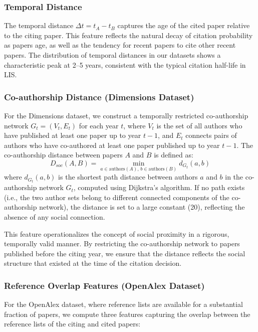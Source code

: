 \documentclass[12pt,a4paper]{article}
\begin{document}
\subsubsection{Temporal Distance}

The temporal distance $\Delta t = t_A - t_B$ captures the age of the cited paper relative to the citing paper. This feature reflects the natural decay of citation probability as papers age, as well as the tendency for recent papers to cite other recent papers. The distribution of temporal distances in our datasets shows a characteristic peak at 2--5 years, consistent with the typical citation half-life in LIS.

\subsubsection{Co-authorship Distance (Dimensions Dataset)}

For the Dimensions dataset, we construct a temporally restricted co-authorship network $G_t = (V_t, E_t)$ for each year $t$, where $V_t$ is the set of all authors who have published at least one paper up to year $t-1$, and $E_t$ connects pairs of authors who have co-authored at least one paper published up to year $t-1$. The co-authorship distance between papers $A$ and $B$ is defined as:
\begin{equation}
D_{soc}(A, B) = \min_{a \in \text{authors}(A),\, b \in \text{authors}(B)} d_{G_t}(a, b)
\end{equation}
where $d_{G_t}(a, b)$ is the shortest path distance between authors $a$ and $b$ in the co-authorship network $G_t$, computed using Dijkstra's algorithm. If no path exists (i.e., the two author sets belong to different connected components of the co-authorship network), the distance is set to a large constant (20), reflecting the absence of any social connection.

This feature operationalizes the concept of social proximity in a rigorous, temporally valid manner. By restricting the co-authorship network to papers published before the citing year, we ensure that the distance reflects the social structure that existed at the time of the citation decision.

\subsubsection{Reference Overlap Features (OpenAlex Dataset)}

For the OpenAlex dataset, where reference lists are available for a substantial fraction of papers, we compute three features capturing the overlap between the reference lists of the citing and cited papers:
\end{document}

